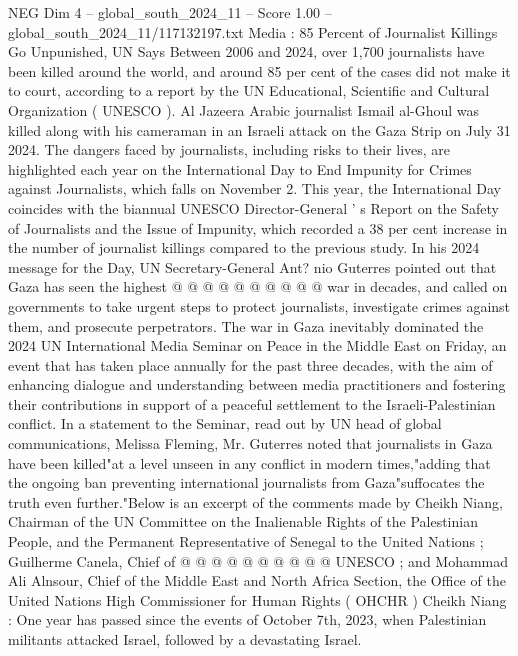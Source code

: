 \begin{textsample}{NEG Dim 4 – global\_south\_2024\_11 – Score 1.00 – global\_south\_2024\_11/117132197.txt}  \label{ex:f4_neg_208}
Media : 85 Percent of Journalist Killings Go Unpunished, UN Says Between 2006 and 2024, over 1,700 journalists have been killed around the world, and around 85 per cent of the cases did not make it to court, according to a report by the UN Educational, Scientific and Cultural Organization ( UNESCO ).
Al Jazeera Arabic journalist Ismail al-Ghoul was killed along with his cameraman in an Israeli attack on the Gaza Strip on July 31 2024.
The dangers faced by journalists, including risks to their lives, are highlighted each year on the International Day to End Impunity for Crimes against Journalists, which falls on November 2.
This year, the International Day coincides with the biannual UNESCO Director-General ' s Report on the Safety of Journalists and the Issue of Impunity, which recorded a 38 per cent increase in the number of journalist killings compared to the previous study.
In his 2024 message for the Day, UN Secretary-General Ant? nio Guterres pointed out that Gaza has seen the highest @ @ @ @ @ @ @ @ @ @ war in decades, and called on governments to take urgent steps to protect journalists, investigate crimes against them, and prosecute perpetrators.
The war in Gaza inevitably dominated the 2024 UN International Media Seminar on Peace in the Middle East on Friday, an event that has taken place annually for the past three decades, with the aim of enhancing dialogue and understanding between media practitioners and fostering their contributions in support of a peaceful settlement to the Israeli-Palestinian conflict.
In a statement to the Seminar, read out by UN head of global communications, Melissa Fleming, Mr.
Guterres noted that journalists in Gaza have been killed"at a level unseen in any conflict in modern times,"adding that the ongoing ban preventing international journalists from Gaza"suffocates the truth even further."Below is an excerpt of the comments made by Cheikh Niang, Chairman of the UN Committee on the Inalienable Rights of the Palestinian People, and the Permanent Representative of Senegal to the United Nations ; Guilherme Canela, Chief of @ @ @ @ @ @ @ @ @ @ UNESCO ; and Mohammad Ali Alnsour, Chief of the Middle East and North Africa Section, the Office of the United Nations High Commissioner for Human Rights ( OHCHR ) Cheikh Niang : One year has passed since the events of October 7th, 2023, when Palestinian militants attacked Israel, followed by a devastating Israel.

\end{textsample}
